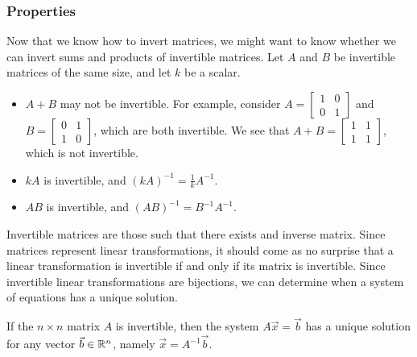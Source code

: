 \subsubsection{Properties}
Now that we know how to invert matrices, we might want to know whether we can invert sums and products of invertible matrices.
Let $A$ and $B$ be invertible matrices of the same size, and let $k$ be a scalar.
\begin{itemize}
	\item
	$A + B$ may not be invertible.
	For example, consider $A = \begin{bmatrix} 1 & 0 \\ 0 & 1 \end{bmatrix}$ and $B = \begin{bmatrix} 0 & 1 \\ 1 & 0 \end{bmatrix}$, which are both invertible.
	We see that	$A+B = \begin{bmatrix} 1 & 1 \\ 1 & 1\end{bmatrix}$, which is not invertible.
	\item
	$kA$ is invertible, and $(kA)^{-1} = \frac{1}{k}A^{-1}$.
	\item
	$AB$ is invertible, and $(AB)^{-1} = B^{-1}A^{-1}$.
\end{itemize}

Invertible matrices are those such that there exists and inverse matrix.
Since matrices represent linear transformations, it should come as no surprise that a linear transformation is invertible if and only if its matrix is invertible.
Since invertible linear transformations are bijections, we can determine when a system of equations has a unique solution.

\begin{theorem}
	If the $n \times n$ matrix $A$ is invertible, then the system $A\vec{x} = \vec{b}$ has a unique solution for any vector $\vec{b} \in \mathbb{R}^n$, namely $\vec{x} = A^{-1}\vec{b}$.
\end{theorem}